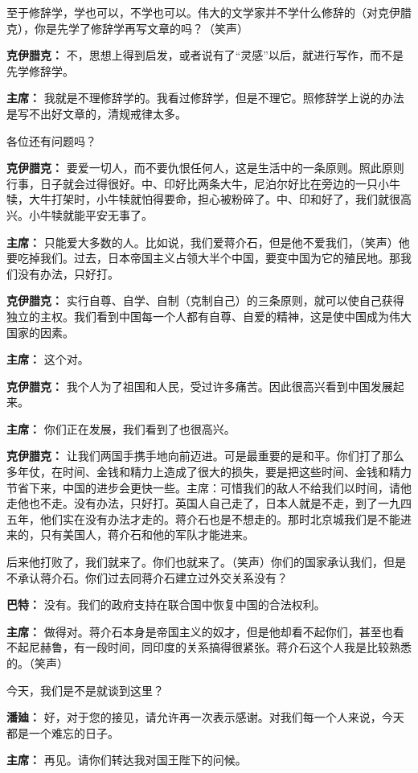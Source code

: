 \begin{duihua}
至于修辞学，学也可以，不学也可以。伟大的文学家并不学什么修辞的（对克伊腊克），你是先学了修辞学再写文章的吗？（笑声）

\item[\textbf{克伊腊克：}] 不，思想上得到启发，或者说有了“灵感”以后，就进行写作，而不是先学修辞学。

\item[\textbf{主席：}] 我就是不理修辞学的。我看过修辞学，但是不理它。照修辞学上说的办法是写不出好文章的，清规戒律太多。

各位还有问题吗？

\item[\textbf{克伊腊克：}] 要爱一切人，而不要仇恨任何人，这是生活中的一条原则。照此原则行事，日子就会过得很好。中、印好比两条大牛，尼泊尔好比在旁边的一只小牛犊，大牛打架时，小牛犊就怕得要命，担心被粉碎了。中、印和好了，我们就很高兴。小牛犊就能平安无事了。

\item[\textbf{主席：}] 只能爱大多数的人。比如说，我们爱蒋介石，但是他不爱我们，（笑声）他要吃掉我们。过去，日本帝国主义占领大半个中国，要变中国为它的殖民地。那我们没有办法，只好打。

\item[\textbf{克伊腊克：}] 实行自尊、自学、自制（克制自己）的三条原则，就可以使自己获得独立的主权。我们看到中国每一个人都有自尊、自爱的精神，这是使中国成为伟大国家的因素。

\item[\textbf{主席：}] 这个对。

\item[\textbf{克伊腊克：}] 我个人为了祖国和人民，受过许多痛苦。因此很高兴看到中国发展起来。

\item[\textbf{主席：}] 你们正在发展，我们看到了也很高兴。

\item[\textbf{克伊腊克：}] 让我们两国手携手地向前迈进。可是最重要的是和平。你们打了那么多年仗，在时间、金钱和精力上造成了很大的损失，要是把这些时间、金钱和精力节省下来，中国的进步会更快一些。主席：可惜我们的敌人不给我们以时间，请他走他也不走。没有办法，只好打。英国人自己走了，日本人就是不走，到了一九四五年，他们实在没有办法才走的。蒋介石也是不想走的。那时北京城我们是不能进来的，只有美国人，蒋介石和他的军队才能进来。

后来他打败了，我们就来了。你们也就来了。（笑声）你们的国家承认我们，但是不承认蒋介石。你们过去同蒋介石建立过外交关系没有？

\item[\textbf{巴特：}] 没有。我们的政府支持在联合国中恢复中国的合法权利。

\item[\textbf{主席：}] 做得对。蒋介石本身是帝国主义的奴才，但是他却看不起你们，甚至也看不起尼赫鲁，有一段时间，同印度的关系搞得很紧张。蒋介石这个人我是比较熟悉的。（笑声）

今天，我们是不是就谈到这里？

\item[\textbf{潘廸：}] 好，对于您的接见，请允许再一次表示感谢。对我们每一个人来说，今天都是一个难忘的日子。

\item[\textbf{主席：}] 再见。请你们转达我对国王陛下的问候。
\end{duihua}
